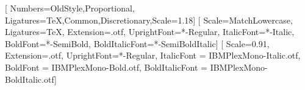 
\usepackage{fontspec}
\usepackage[final,babel=true]{microtype}

\def\gbfuentetexto{Libertinus Serif}
\def\gbfuentetitulos{IBM Plex Sans Condensed}
\def\gbfuentemono{IBM Plex Mono}

\setmainfont{\gbfuentetexto}[
  Numbers={OldStyle,Proportional},
  Ligatures={TeX,Common,Discretionary},Scale=1.18]
\setsansfont{\gbfuentetitulos}[
  Scale=MatchLowercase,
  Ligatures=TeX,
  Extension=.otf,
  UprightFont=*-Regular,
  ItalicFont=*-Italic,
  BoldFont=*-SemiBold,
  BoldItalicFont=*-SemiBoldItalic]
\setmonofont{\gbfuentemono}[
  Scale=0.91,
  Extension=.otf,
  UprightFont=*-Regular,
  ItalicFont = IBMPlexMono-Italic.otf,
  BoldFont = IBMPlexMono-Bold.otf,
  BoldItalicFont = IBMPlexMono-BoldItalic.otf]

